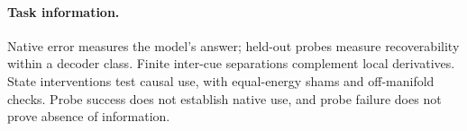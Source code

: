 \paragraph{Task information.}
Native error measures the model's answer; held-out probes measure recoverability within a decoder class. Finite inter-cue separations complement local derivatives. State interventions test causal use, with equal-energy shams and off-manifold checks. Probe success does not establish native use, and probe failure does not prove absence of information.
